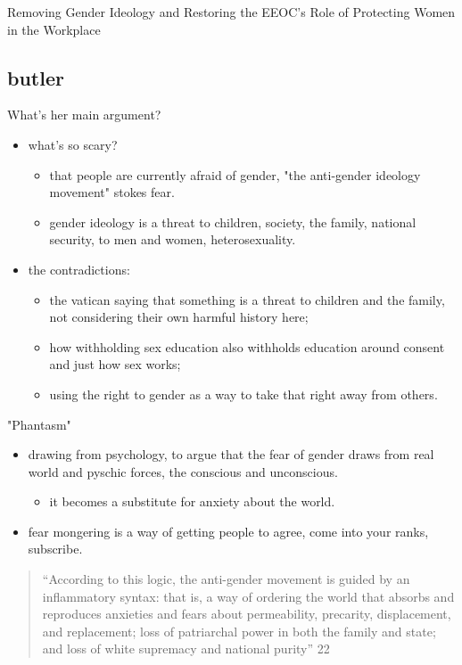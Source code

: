 \documentclass[11pt]{article}
\begin{document}
Removing Gender Ideology and Restoring the EEOC’s Role of Protecting
Women in the Workplace


\subsection{butler}
\label{sec:org2f81e67}
What's her main argument?
\begin{itemize}
\item what's so scary?
\begin{itemize}
\item that people are currently afraid of gender, "the anti-gender
ideology movement" stokes fear.
\item gender ideology is a threat to children, society, the family,
national security, to men and women, heterosexuality.
\end{itemize}
\item the contradictions:
\begin{itemize}
\item the vatican saying that something is a threat to children and the
family, not considering their own harmful history here;
\item how withholding sex education also withholds education around
consent and just how sex works;
\item using the right to gender as a way to take that right away from
others.
\end{itemize}
\end{itemize}

"Phantasm"
\begin{itemize}
\item drawing from psychology, to argue that the fear of gender draws from
real world and pyschic forces, the conscious and unconscious.
\begin{itemize}
\item it becomes a substitute for anxiety about the world.
\end{itemize}
\item fear mongering is a way of getting people to agree, come into your
ranks, subscribe.
\end{itemize}

\begin{quote}
“According to this logic, the anti-gender movement is guided by an
inflammatory syntax: that is, a way of ordering the world that absorbs
and reproduces anxieties and fears about permeability, precarity,
displacement, and replacement; loss of patriarchal power in both the
family and state; and loss of white supremacy and national purity” 22
\end{quote}
\end{document}
